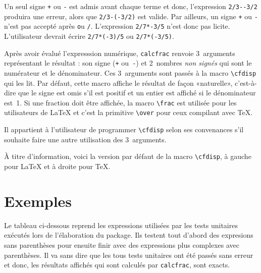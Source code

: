 \documentclass[10pt,a4paper,french]{article}
\begin{document}
Un seul signe \texttt+ ou \texttt- est admis avant chaque terme et donc, l'expression \verb|2/3--3/2| produira une erreur, alors que \verb|2/3-(-3/2)| est valide. Par ailleurs, un signe \texttt+ ou \texttt- n'est pas accepté après \texttt* ou \texttt/. L'expression \verb|2/7*-3/5| n'est donc pas licite. L'utilisateur devrait écrire \verb|2/7*(-3)/5| ou \verb|2/7*(-3/5)|.

Après avoir évalué l'expresssion numérique, \texttt{calcfrac} renvoie 3~arguments représentant le résultat : son signe (\texttt+ ou~\texttt-) et 2~nombres \emph{non signés} qui sont le numérateur et le dénominateur. Ces 3~arguments sont passés à la macro \verb|\cfdisp| qui les lit. Par défaut, cette macro affiche le résultat de façon «naturelle», c'est-à-dire que le signe est omis s'il est positif et un entier est affiché si le dénominateur est~1. Si une fraction doit être affichée, la macro \verb|\frac| est utilisée pour les utilisateurs de \LaTeX{} et c'est la primitive \verb|\over| pour ceux compilant avec \TeX.

Il appartient à l'utilisateur de programmer \verb|\cfdisp| selon ses convenances s'il souhaite faire une autre utilisation des 3~arguments.

À titre d'information, voici la version par défaut de la macro \verb|\cfdisp|, à gauche pour \LaTeX{} et à droite pour \TeX.

\leavevmode{}
\hfill
\vtop{%
\hsize=0.6\linewidth
\small
\begin{verbatim}
\def\cfdisp#1#2#3{%
    \ifmmode\expandafter\cf@execarg\else\expandafter\cf@matharg\fi
            {\ifnum#11=-1 -\fi
            {\ifnum#3=1
                #2%
            \else
                #2\over#3%
            \fi
            }%
            }%
}%
\end{verbatim}
}\hfill\null
\section{Exemples}
Le tableau ci-dessous reprend les expressions utilisées par les tests unitaires exécutés lors de l'élaboration du package. Ils testent tout d'abord des expresions sans parenthèses pour ensuite finir avec des expressions plus complexes avec parenthèses. Il va sans dire que les tous tests unitaires ont été passés sans erreur et donc, les résultats affichés qui sont calculés par \texttt{calcfrac}, sont exacts.
\end{document}
